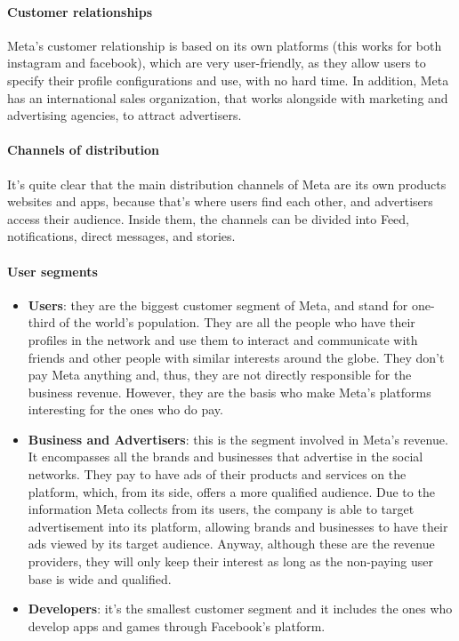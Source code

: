 \paragraph{Customer relationships}
Meta's customer relationship is based on its own platforms (this works
for both instagram and facebook), which are very user-friendly, as
they allow users to specify their profile configurations and use, with
no hard time. In addition, Meta has an international sales
organization, that works alongside with marketing and advertising
agencies, to attract advertisers.

\paragraph{Channels of distribution}
It's quite clear that the main distribution channels of Meta are its
own products websites and apps, because that's where users find each
other, and advertisers access their audience. Inside them, the
channels can be divided into Feed, notifications, direct messages, and
stories.

\paragraph{User segments}
\begin{itemize}
\item \textbf{Users}: they are the biggest customer segment of Meta,
  and stand for one-third of the world's population. They are all the
  people who have their profiles in the network and use them to
  interact and communicate with friends and other people with similar
  interests around the globe. They don't pay Meta anything and, thus,
  they are not directly responsible for the business revenue. However,
  they are the basis who make Meta's platforms interesting for the
  ones who do pay.

\item \textbf{Business and Advertisers}: this is the segment involved
  in Meta's revenue. It encompasses all the brands and businesses that
  advertise in the social networks. They pay to have ads of their
  products and services on the platform, which, from its side, offers
  a more qualified audience. Due to the information Meta collects from
  its users, the company is able to target advertisement into its
  platform, allowing brands and businesses to have their ads viewed by
  its target audience. Anyway, although these are the revenue
  providers, they will only keep their interest as long as the
  non-paying user base is wide and qualified.

\item \textbf{Developers}: it's the smallest customer segment and it
  includes the ones who develop apps and games through Facebook's
  platform.
\end{itemize}

